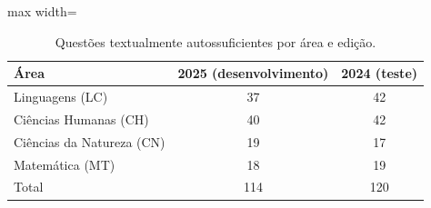 \begin{table}[ht]
\centering
\caption{Questões textualmente autossuficientes por área e edição.}\label{tab:itens}
\small
\begin{adjustbox}{max width=\linewidth}
\begin{tabular}{lcc}
\toprule
Área & 2025 (desenvolvimento) & 2024 (teste) \\
\midrule
Linguagens (LC) & 37 & 42 \\
Ciências Humanas (CH) & 40 & 42 \\
Ciências da Natureza (CN) & 19 & 17 \\
Matemática (MT) & 18 & 19 \\
\midrule
Total & 114 & 120 \\
\bottomrule
\end{tabular}
\end{adjustbox}
\end{table}
